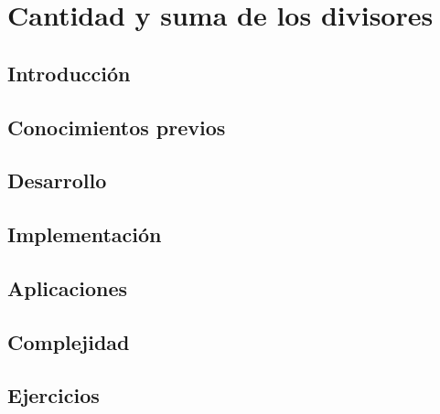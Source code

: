 \chapter{Cantidad y suma de los divisores}
\section{Introducción}

\section{Conocimientos previos}

\section{Desarrollo}

\section{Implementación}

\section{Aplicaciones}

\section{Complejidad}

\section{Ejercicios}
